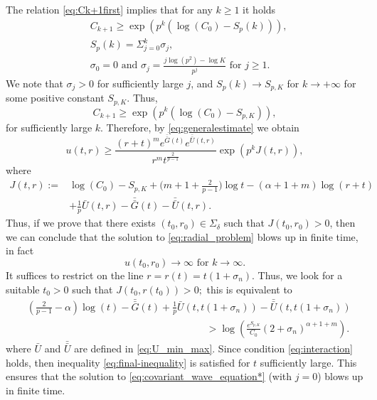 \documentclass[11pt,reqno]{amsart}
\theoremstyle{definition}
\numberwithin{equation}{section}
\newcommand{\bbar}[1]{\bar{\bar{#1}}}
\begin{document}
The relation \eqref{eq:Ck+1first} implies  that for any $k\geq 1$ it holds
\begin{align}
&C_{k+1}\geq \exp\left(p^{k}\left(\log(C_0)-S_p(k)\right)\right),
\label{eq:sequ3}\\
&S_p(k)=\displaystyle{\Sigma_{j=0}^k} \sigma_j,\\& \sigma_0=0 \text{ and }  \sigma_j=\frac{j\log(p^2)-\log K}{p^{j}} \text{ for } j\geq 1.
\end{align}
We note that $\sigma_j>0$ for sufficiently large $j$, and $S_p(k)\to S_{p,K}$ for $k\to +\infty$ for some positive constant $S_{p,K}$. Thus, 
\begin{equation}
\label{eq:Ck+1}
C_{k+1}\geq \exp(p^{k}(\log (C_0)-S_{p,K})),
\end{equation}
%
for sufficiently large $k$.
Therefore, by \eqref{eq:generalestimate} we obtain 
\begin{equation}
\label{eq:finaluestimate}
u(t,r)\geq \frac{(r+t)^m e^{\bbar G(t)} e^{\bbar U(t,r)}}{r^m t^{\frac{2}{p-1}}}\exp(p^k J(t,r)),
\end{equation}
where 
\begin{align*}
J(t,r):=&\log(C_0)-S_{p,K}+\Big(m+1+\frac{2}{p-1}\Big)\log t-(\alpha+1+m)\log(r+t)\\
&
+\frac{1}{p}\bar U(t,r)-\bbar G(t)-\bbar U(t,r).
\end{align*}
Thus, if we prove that there exists $(t_0,r_0)\in \Sigma_\delta $ such that $J(t_0,r_0)>0$, then we can conclude that the solution to \eqref{eq:radial_problem} blows up in finite time, in fact
\[ 
u(t_0,r_0)\to \infty  \text{ for } k\to \infty. 
\]
It suffices to restrict on the line $r=r(t)=t\left(1+\sigma_n\right)$. Thus, we look for a suitable $t_0>0$ such that $J(t_0, r(t_0))>0;$ this is equivalent to 
\begin{equation}
\begin{aligned}
\label{eq:final-inequality}
   &\left(\frac{2}{p-1}-\alpha\right)\log(t)-\bbar{G}(t)+\frac{1}{p} \bar U(t,t(1+\sigma_n))- \bbar U(t,t(1+\sigma_n))\\  &\hspace{18em}>\log\left(\frac{e^{S_{p,K}}}{C_0}\left(2+\sigma_n\right)^{\alpha+1+m}\right).
\end{aligned}
\end{equation}
where $\bar U$ and $\bbar U$ are defined in \eqref{eq:U_min_max}.
%
Since condition \eqref{eq:interaction} holds, then inequality \eqref{eq:final-inequality} is satisfied for $t$ sufficiently large. This ensures that the solution to \eqref{eq:covariant_wave_equation*} (with $j=0$) blows up in finite time.
\end{document}

